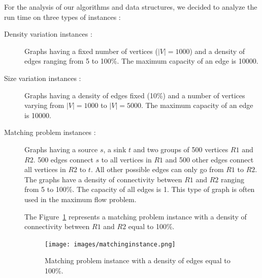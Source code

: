 
For the analysis of our algorithms and data structures, we decided to analyze the run time on three types of instances :
\begin{description}
\item[Density variation instances :]{Graphs having a fixed number of vertices ($|V|=1000$) and a density of edges ranging from 5 to 100\%. The maximum capacity of an edge is 10000.}
\item[Size variation instances :]{Graphs having a density of edges fixed (10\%) and a number of vertices varying from $|V|=1000$ to $|V|=5000$. The maximum capacity of an edge is 10000.}
\item[Matching problem instances :]{Graphs having a source $s$, a sink $t$ and two groups of 500 vertices $R1$ and $R2$. 500 edges connect $s$ to all vertices in $R1$ and 500 other edges connect all vertices in $R2$ to $t$. All other possible edges can only go from $R1$ to $R2$. The graphs have a density of connectivity between $R1$ and $R2$ ranging from 5 to 100\%. The capacity of all edges is 1.
This type of graph is often used in the maximum flow problem.

The Figure~\ref{fig:matching} represents a matching problem instance with a density of  connectivity between $R1$ and $R2$ equal to 100\%.

\begin{figure}[H]
\begin{center}
\texttt{[image: images/matchinginstance.png]}
\caption{Matching problem instance with a density of edges equal to 100\%.}
\label{fig:matching}
\end{center}
\end{figure}}
\end{description} 


